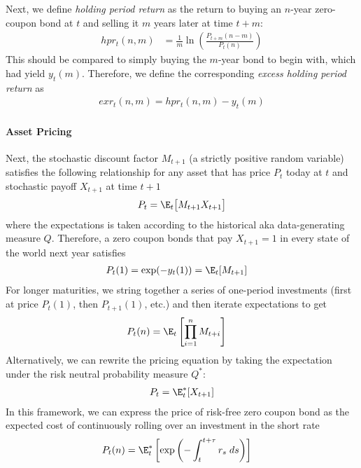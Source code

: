 \documentclass[12pt]{article}
\theoremstyle{plain}
\theoremstyle{definition}
\theoremstyle{remark}
\begin{document}
\begin{multicols*}{2}
Next, we define \emph{holding period return} as the return to buying an
$n$-year zero-coupon bond at $t$ and selling it $m$ years later at time
$t+m$:
\begin{align*}
  hpr_t(n,m)
  &=
  \frac{1}{m}
  \ln
  \left(
  \frac{P_{t+m}(n-m)}{P_t(n)}
  \right)
\end{align*}
This should be compared to simply buying the $m$-year bond to begin
with, which had yield $y_t(m)$. Therefore, we define the corresponding
\emph{excess holding period return} as
\begin{align*}
  exr_t(n,m)
  = hpr_t(n,m) - y_t(m)
\end{align*}

\paragraph{Asset Pricing}
Next, the stochastic discount factor $M_{t+1}$ (a strictly positive
random variable) satisfies the following relationship for any asset that
has price $P_t$ today at $t$ and stochastic payoff $X_{t+1}$ at time
$t+1$
\begin{align*}
  P_t = \E_t\big[M_{t+1}X_{t+1}\big]
\end{align*}
where the expectations is taken according to the historical aka
data-generating measure $Q$.
Therefore, a zero coupon bonds that pay $X_{t+1}=1$ in every state of
the world next year satisfies
\begin{align*}
  P_t(1)
  = \exp(-y_t(1))
  &= \E_t[M_{t+1}]
\end{align*}
For longer maturities, we string together a series of one-period
investments (first at price $P_t(1)$, then $P_{t+1}(1)$, etc.) and then
iterate expectations to get
\begin{align*}
  P_t(n)
  &= \E_t\left[\prod_{i=1}^n M_{t+i}\right]
\end{align*}
Alternatively, we can rewrite the pricing equation by taking the
expectation under the risk neutral probability measure $Q^*$:
\begin{align*}
  P_t = \E_t^*[X_{t+1}]
\end{align*}
In this framework, we can express the price of risk-free zero coupon
bond as the expected cost of continuously rolling over an investment in
the short rate
\begin{align*}
  P_t(n)
  &=
  \E^*_t\left[
    \exp\left(
    -\int_t^{t+\tau} r_s \; ds
    \right)
  \right]
\end{align*}
\end{multicols*}
\end{document}
